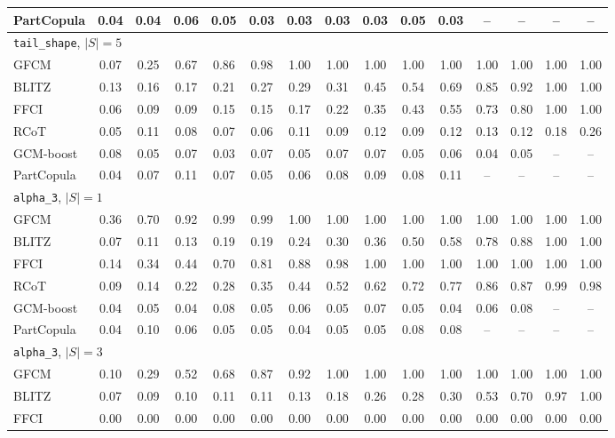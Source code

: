 \begin{longtable}{l*{14}{c}}
PartCopula & 0.04 & 0.04 & 0.06 & 0.05 & 0.03 & 0.03 & 0.03 & 0.03 & 0.05 & 0.03 & -- & -- & -- & -- \\
\midrule \multicolumn{15}{l}{\texttt{tail\_shape}, $|S|=5$}\\
GFCM & 0.07 & 0.25 & 0.67 & 0.86 & 0.98 & 1.00 & 1.00 & 1.00 & 1.00 & 1.00 & 1.00 & 1.00 & 1.00 & 1.00 \\
BLITZ & 0.13 & 0.16 & 0.17 & 0.21 & 0.27 & 0.29 & 0.31 & 0.45 & 0.54 & 0.69 & 0.85 & 0.92 & 1.00 & 1.00 \\
FFCI & 0.06 & 0.09 & 0.09 & 0.15 & 0.15 & 0.17 & 0.22 & 0.35 & 0.43 & 0.55 & 0.73 & 0.80 & 1.00 & 1.00 \\
RCoT & 0.05 & 0.11 & 0.08 & 0.07 & 0.06 & 0.11 & 0.09 & 0.12 & 0.09 & 0.12 & 0.13 & 0.12 & 0.18 & 0.26 \\
GCM-boost & 0.08 & 0.05 & 0.07 & 0.03 & 0.07 & 0.05 & 0.07 & 0.07 & 0.05 & 0.06 & 0.04 & 0.05 & -- & -- \\
PartCopula & 0.04 & 0.07 & 0.11 & 0.07 & 0.05 & 0.06 & 0.08 & 0.09 & 0.08 & 0.11 & -- & -- & -- & -- \\
\midrule \multicolumn{15}{l}{\texttt{alpha\_3}, $|S|=1$}\\
GFCM & 0.36 & 0.70 & 0.92 & 0.99 & 0.99 & 1.00 & 1.00 & 1.00 & 1.00 & 1.00 & 1.00 & 1.00 & 1.00 & 1.00 \\
BLITZ & 0.07 & 0.11 & 0.13 & 0.19 & 0.19 & 0.24 & 0.30 & 0.36 & 0.50 & 0.58 & 0.78 & 0.88 & 1.00 & 1.00 \\
FFCI & 0.14 & 0.34 & 0.44 & 0.70 & 0.81 & 0.88 & 0.98 & 1.00 & 1.00 & 1.00 & 1.00 & 1.00 & 1.00 & 1.00 \\
RCoT & 0.09 & 0.14 & 0.22 & 0.28 & 0.35 & 0.44 & 0.52 & 0.62 & 0.72 & 0.77 & 0.86 & 0.87 & 0.99 & 0.98 \\
GCM-boost & 0.04 & 0.05 & 0.04 & 0.08 & 0.05 & 0.06 & 0.05 & 0.07 & 0.05 & 0.04 & 0.06 & 0.08 & -- & -- \\
PartCopula & 0.04 & 0.10 & 0.06 & 0.05 & 0.05 & 0.04 & 0.05 & 0.05 & 0.08 & 0.08 & -- & -- & -- & -- \\
\midrule \multicolumn{15}{l}{\texttt{alpha\_3}, $|S|=3$}\\
GFCM & 0.10 & 0.29 & 0.52 & 0.68 & 0.87 & 0.92 & 1.00 & 1.00 & 1.00 & 1.00 & 1.00 & 1.00 & 1.00 & 1.00 \\
BLITZ & 0.07 & 0.09 & 0.10 & 0.11 & 0.11 & 0.13 & 0.18 & 0.26 & 0.28 & 0.30 & 0.53 & 0.70 & 0.97 & 1.00 \\
FFCI & 0.00 & 0.00 & 0.00 & 0.00 & 0.00 & 0.00 & 0.00 & 0.00 & 0.00 & 0.00 & 0.00 & 0.00 & 0.00 & 0.00 \\

\end{longtable}
